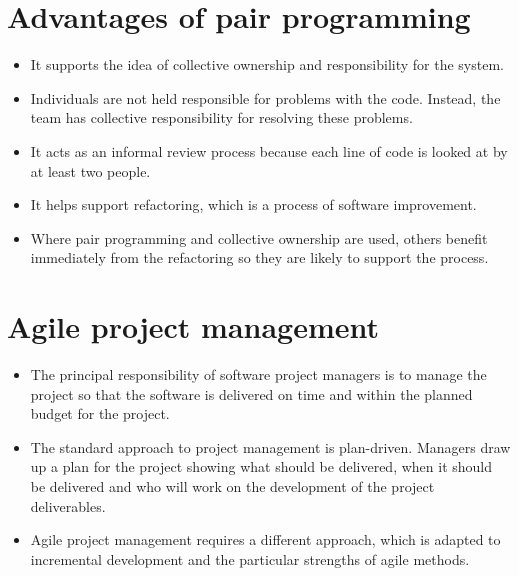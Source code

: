 \section{Advantages of pair programming}
\begin{itemize}

\item It supports the idea of collective ownership and responsibility for the system.

\item Individuals are not held responsible for problems with the code. Instead, the team has collective responsibility for resolving these problems.

\item It acts as an informal review process because each line of code is looked at by at least two people.

\item It helps support refactoring, which is a process of software improvement.

\item Where pair programming and collective ownership are used, others benefit immediately from the refactoring so they are likely to support the process.

\end{itemize}

\section{ Agile project management}
\begin{itemize}
\item The principal responsibility of software project managers is to manage the project so that the software is delivered on time and within the planned budget for the project.

\item The standard approach to project management is plan-driven. Managers draw up a plan for the project showing what should be delivered, when it should be delivered and who will work on the development of the project deliverables.

\item Agile project management requires a different approach, which is adapted to incremental development and the particular strengths of agile methods.


\end{itemize}
